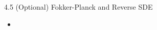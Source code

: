 \begin{frame}{4.5 (Optional) Fokker-Planck and Reverse SDE}
    \begin{itemize}
        \item
    \end{itemize}
\end{frame}
